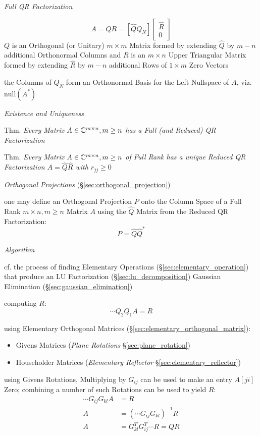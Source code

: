 \emph{Full QR Factorization}

\[
  A = QR = [\hat{Q}Q_N]\begin{bmatrix} \hat{R} \\ 0 \end{bmatrix}
\]
$Q$ is an Orthogonal (or Unitary) $m \times m$ Matrix formed by extending
$\hat{Q}$ by $m - n$ additional Orthonormal Columns and $R$ is an $m \times n$
Upper Triangular Matrix formed by extending $\hat{R}$ by $m - n$ additional
Rows of $1 \times m$ Zero Vectors

the Columns of $Q_N$ form an Orthonormal Basis for the Left Nullspace of $A$,
viz. $\mathrm{null}(A^*)$


\emph{Existence and Uniqueness}

Thm. \emph{Every Matrix $A \in \mathbb{C}^{m \times n}, m \geq n$ has a Full (and
  Reduced) QR Factorization}

Thm. \emph{Every Matrix $A \in \mathbb{C}^{m \times n}, m \geq n$ of Full Rank has
  a unique Reduced QR Factorization $A = \hat{Q}\hat{R}$ with $r_{jj} \geq 0$}


\emph{Orthogonal Projections} (\S\ref{sec:orthogonal_projection})

one may define an Orthogonal Projection $P$ onto the Column Space of a Full Rank
$m \times n, m \geq n$ Matrix $A$ using the $\hat{Q}$ Matrix from the Reduced
QR Factorization:
\[
  P = \hat{Q}\hat{Q}^*
\]


\emph{Algorithm}

cf. the process of finding Elementary Operations
(\S\ref{sec:elementary_operation}) that produce an LU Factorization
(\S\ref{sec:lu_decomposition}) \fist Gaussian Elimination
(\S\ref{sec:gaussian_elimination})

computing $R$:
\[
  \cdots Q_2 Q_1 A = R
\]

using Elementary Orthogonal Matrices (\S\ref{sec:elementary_orthogonal_matrix}):
\begin{itemize}
  \item Givens Matrices (\emph{Plane Rotations} \S\ref{sec:plane_rotation})
  \item Householder Matrices (\emph{Elementary Reflector}
    \S\ref{sec:elementary_reflector})
\end{itemize}

using Givens Rotations, Multiplying by $G_{ij}$ can be used to make an entry
$A[ji]$ Zero; combining a number of such Rotations can be used to yield $R$:
\begin{align*}
  \cdots G_{ij}G_{kl}A & = R \\
  A & = (\cdots G_{ij}G_{kl})^{-1}R \\
  A & = G_{kl}^T G_{ij}^T \cdots R = QR
\end{align*}


